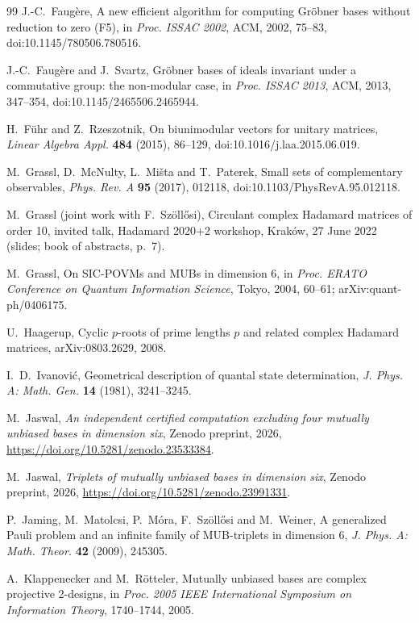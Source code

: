 \documentclass[11pt]{article}
\theoremstyle{definition}
\theoremstyle{remark}
\begin{document}
\begin{thebibliography}{99}
 J.-C.~Faugère, A new efficient algorithm for computing Gröbner bases without reduction to zero
  (F5), in \emph{Proc. ISSAC 2002}, ACM, 2002, 75--83, doi:10.1145/780506.780516.

 J.-C.~Faugère and J.~Svartz, Gröbner bases of ideals invariant under a commutative group:
  the non-modular case, in \emph{Proc. ISSAC 2013}, ACM, 2013, 347--354, doi:10.1145/2465506.2465944.

 H.~F\"uhr and Z.~Rzeszotnik, On biunimodular vectors for unitary matrices, \emph{Linear
  Algebra Appl.} \textbf{484} (2015), 86--129, doi:10.1016/j.laa.2015.06.019.

 M.~Grassl, D.~McNulty, L.~Mi\v{s}ta and T.~Paterek, Small sets of complementary observables,
  \emph{Phys. Rev. A} \textbf{95} (2017), 012118, doi:10.1103/PhysRevA.95.012118.

 M.~Grassl (joint work with F.~Sz\"oll\H{o}si), Circulant complex Hadamard matrices of
  order 10, invited talk, Hadamard 2020+2 workshop, Kraków, 27 June 2022 (slides; book of abstracts, p.~7).

 M.~Grassl, On SIC-POVMs and MUBs in dimension 6, in \emph{Proc. ERATO Conference on Quantum
  Information Science}, Tokyo, 2004, 60--61; arXiv:quant-ph/0406175.

 U.~Haagerup, Cyclic $p$-roots of prime lengths $p$ and related complex Hadamard matrices,
  arXiv:0803.2629, 2008.

 I.~D.~Ivanović, Geometrical description of quantal state determination,
  \emph{J. Phys. A: Math. Gen.} \textbf{14} (1981), 3241--3245.

 M.~Jaswal, \emph{An independent certified computation excluding four mutually unbiased bases in
  dimension six}, Zenodo preprint, 2026, \url{https://doi.org/10.5281/zenodo.23533384}.

 M.~Jaswal, \emph{Triplets of mutually unbiased bases in dimension six}, Zenodo preprint, 2026,
  \url{https://doi.org/10.5281/zenodo.23991331}.

 P.~Jaming, M.~Matolcsi, P.~M\'ora, F.~Sz\"oll\H{o}si and M.~Weiner, A generalized Pauli problem and
  an infinite family of MUB-triplets in dimension 6, \emph{J. Phys. A: Math. Theor.} \textbf{42} (2009), 245305.

 A.~Klappenecker and M.~Rötteler, Mutually unbiased bases are complex projective
  2-designs, in \emph{Proc. 2005 IEEE International Symposium on Information Theory}, 1740--1744, 2005.


\end{thebibliography}
\end{document}
